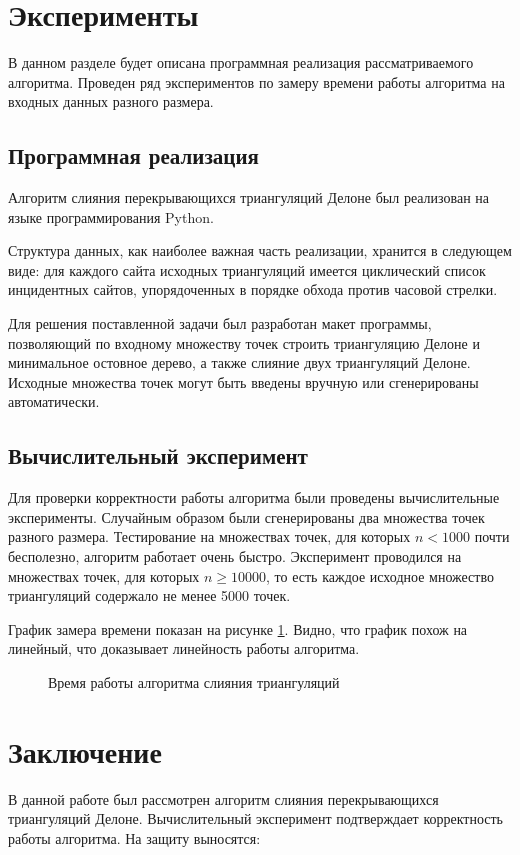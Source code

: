 \documentclass[12pt]{article}
\begin{document}
\section{Эксперименты}
В данном разделе будет описана программная реализация рассматриваемого алгоритма.
Проведен ряд экспериментов по замеру времени работы алгоритма на входных данных разного размера.

\subsection{Программная реализация}
Алгоритм слияния перекрывающихся триангуляций Делоне был реализован на языке программирования Python.

Структура данных, как наиболее важная часть реализации, хранится в следующем виде:
для каждого сайта исходных триангуляций имеется циклический список инцидентных сайтов,
упорядоченных в порядке обхода против часовой стрелки.

Для решения поставленной задачи был разработан макет программы,
позволяющий по входному множеству точек строить триангуляцию Делоне и минимальное остовное дерево,
а также слияние двух триангуляций Делоне.
Исходные множества точек могут быть введены вручную или сгенерированы автоматически.

\subsection{Вычислительный эксперимент}
Для проверки корректности работы алгоритма были проведены вычислительные эксперименты.
Случайным образом были сгенерированы два множества точек разного размера.
Тестирование на множествах точек, для которых $n < 1000$ почти бесполезно,
алгоритм работает очень быстро.
Эксперимент проводился на множествах точек, для которых $n \ge 10000$,
то есть каждое исходное множество триангуляций содержало не менее 5000 точек.

График замера времени показан на рисунке \ref{pic:timeWork}.
Видно, что график похож на линейный, что доказывает линейность работы алгоритма.

\begin{figure}[htb!]
	\caption{Время работы алгоритма слияния триангуляций}
	\label{pic:timeWork}
\end{figure}

\section{Заключение}
В данной работе был рассмотрен алгоритм слияния перекрывающихся триангуляций Делоне.
Вычислительный эксперимент подтверждает корректность работы алгоритма.
На защиту выносятся:
\end{document}
